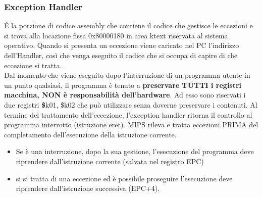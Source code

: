 \documentclass[12pt, a4paper, openany]{book}
\begin{document}
\subsubsection*{Exception Handler}
\'E la porzione di codice assembly che contiene il codice che gestisce le eccezioni
e si trova alla locazione fissa 0x80000180 in area ktext riservata al sistema operativo.
Quando si presenta un eccezione viene caricato nel PC l'indirizzo dell'Handler, così che
venga eseguito il codice che si occupa di capire di che eccezione si tratta.
\\ Dal momento che viene eseguito dopo l'interruzione di un programma utente in un punto
qualsiasi, il programma è tenuto a \textbf{preservare TUTTI i registri macchina, NON è responsabilità dell'hardware}.
Ad esso sono riservati i due registri \textbf \$k01, \$k02 che può utilizzare senza doverne preservare i contenuti.
Al termine del trattamento dell'eccezione, l'exception handler ritorna il controllo al programma
interrotto (istruzione eret).
MIPS rileva e tratta eccezioni PRIMA del completamento dell'esecuzione della istruzione corrente.
\begin{itemize}
    \item Se è una interruzione, dopo la sua gestione, l'esecuzione del programma deve
    riprendere dall'istruzione corrente (salvata nel registro EPC)
    \item si si tratta di una eccezione ed è possibile proseguire l'esecuzione deve riprendere
    dall'istruzione successiva (EPC+4).
\end{itemize}
\end{document}
